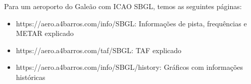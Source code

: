 Para um aeroporto do Galeão com ICAO SBGL, temos as seguintes páginas:

\begin{itemize}
    \item https://aero.a4barros.com/info/SBGL: Informações de pista, frequências e METAR explicado
    \item https://aero.a4barros.com/taf/SBGL: TAF explicado
    \item https://aero.a4barros.com/info/SBGL/history: Gráficos com informações históricas
\end{itemize}